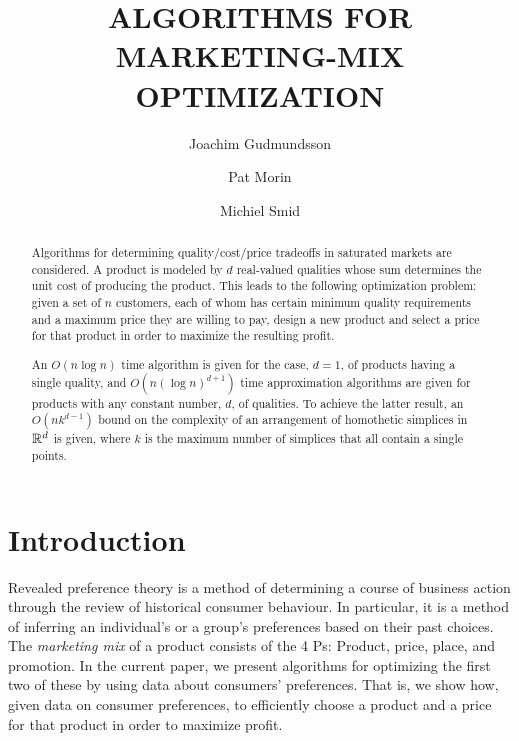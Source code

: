\documentclass[lotsofwhite]{patmorin}
\title{\MakeUppercase{Algorithms for Marketing-Mix Optimization}}
\author{Joachim Gudmundsson%
	\and Pat Morin%
	\and Michiel Smid}
\begin{document}
\maketitle
\begin{abstract}
  Algorithms for determining quality/cost/price tradeoffs in saturated
  markets are considered.  A product is modeled by $d$ real-valued
  qualities whose sum determines the unit cost of producing the product.
  This leads to the following optimization problem: given a set of $n$
  customers, each of whom has certain minimum quality requirements and a
  maximum price they are willing to pay, design a new product and select
  a price for that product in order to maximize the resulting profit.

  An $O(n\log n)$ time algorithm is given for the case, $d=1$, of products
  having a single quality, and $O(n(\log n)^{d+1})$ time approximation
  algorithms are given for products with any constant number, $d$,
  of qualities.  To achieve the latter result, an $O(nk^{d-1})$ bound
  on the complexity of an arrangement of homothetic simplices in $\mathbb{R}^d$
  is given, where $k$ is the maximum number of simplices that all contain
  a single points.
\end{abstract}

\section{Introduction}

Revealed preference theory \cite{v06} is a method of determining a course
of business action through the review of historical consumer behaviour.  In
particular, it is a method of inferring an individual's or a group's
preferences based on their past choices.  The \emph{marketing mix}
\cite{kpkl05} of a product consists of the 4 Ps: Product, price, place, and
promotion.  In the current paper, we present algorithms for optimizing the
first two of these by using data about consumers' preferences.  That is, we
show how, given data on consumer preferences, to efficiently choose a
product and a price for that product in order to maximize profit.
\end{document}

